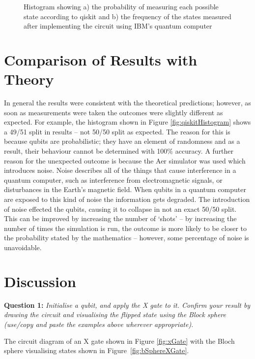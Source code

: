 \begin{figure}[H]
\begin{subfigure}[h]{0.43\textwidth}
        \caption{} 
        \label{fig:ibmHistogram}
    \end{subfigure}
    \captionsetup{font = it, labelfont = bf, width=.91\linewidth, justification=centering}
    \caption{Histogram showing a) the probability of measuring each possible state according to qiskit and b) the frequency of the states measured after implementing the circuit using IBM's quantum computer} 
    \label{fig:hisogram}
\end{figure}

\section{Comparison of Results with Theory} \label{sec:comparison}
In general the results were consistent with the theoretical predictions; however, as soon as measurements were taken the outcomes were slightly different as expected. For example, the histogram shown in Figure \ref{fig:qiskitHistogram} shows a 49/51 split in results -- not 50/50 split as expected. The reason for this is because qubits are probabilistic; they have an element of randomness and as a result, their behaviour cannot be determined with 100\% accuracy. A further reason for the unexpected outcome is because the Aer simulator was used which introduces noise. Noise describes all of the things that cause interference in a quantum computer, such as interference from electromagnetic signals, or disturbances in the Earth’s magnetic field. When qubits in a quantum computer are exposed to this kind of noise the information gets degraded. The introduction of noise effected the qubits, causing it to collapse in not an exact 50/50 split. This can be improved by increasing the number of `shots' -- by increasing the number of times the simulation is run, the outcome is more likely to be closer to the probability stated by the mathematics -- however, some percentage of noise is unavoidable.

\section{Discussion} \label{sec:discussion}
\textbf{Question 1:}
\textit{Initialise a qubit, and apply the X gate to it. Confirm your result by drawing the circuit and visualising the flipped state using the Block sphere (use/copy and paste the examples above wherever appropriate).}

The circuit diagram of an X gate shown in Figure \ref{fig:xGate} with the Bloch sphere visualising states shown in Figure~\ref{fig:bSphereXGate}.

